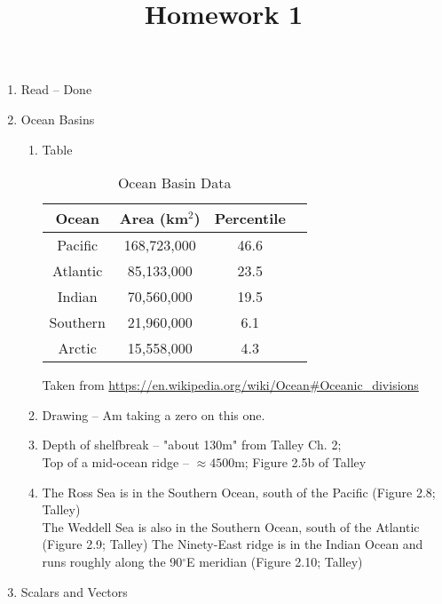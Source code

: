 \documentclass[11pt,letterpaper]{article}
\begin{document}
\title{Homework 1}

\maketitle

\begin{enumerate}
\item Read -- Done

\item Ocean Basins

\begin{enumerate}

\item Table

\begin{table}[ht]
\caption{Ocean Basin Data}
\label{tab:dla}
\begin{center}
\begin{tabular}{cccc}
\hline
Ocean & Area (km$^2$) & Percentile \\
\hline
Pacific & 168,723,000 & 46.6 \\
Atlantic & 85,133,000 & 23.5 \\
Indian & 70,560,000 & 19.5 \\
Southern & 21,960,000 & 6.1 \\
Arctic & 15,558,000 & 4.3 \\
\hline
\end{tabular}
\end{center}
\end{table}
Taken from \url{https://en.wikipedia.org/wiki/Ocean#Oceanic_divisions}


\item Drawing -- Am taking a zero on this one.

\item Depth of shelfbreak -- "about 130m" from Talley Ch. 2;  \\
Top of a mid-ocean ridge -- $\approx 4500$m;  Figure 2.5b of Talley

\item The Ross Sea is in the Southern Ocean, south of the Pacific (Figure 2.8; Talley) \\
The Weddell Sea is also in the Southern Ocean, south of the Atlantic (Figure 2.9; Talley)
The Ninety-East ridge is in the Indian Ocean and runs roughly along the 90$^\circ$E meridian
(Figure 2.10; Talley)

\end{enumerate}

\item Scalars and Vectors


\end{enumerate}
\end{document}
